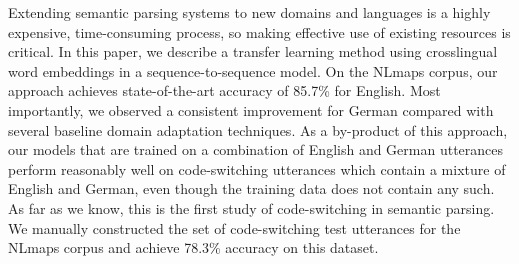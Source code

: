 Extending semantic parsing systems to new domains and languages is a highly expensive, time-consuming process, so making effective use of existing resources is critical. In this paper, we describe a transfer learning method using crosslingual word embeddings in a sequence-to-sequence model.  On the NLmaps corpus, our approach achieves state-of-the-art accuracy of 85.7\% for English.  Most importantly, we observed a consistent improvement for German compared with several baseline domain adaptation techniques.  As a by-product of this approach, our models that are trained on a combination of English and German utterances perform reasonably well on code-switching utterances which contain a mixture of English and German, even though the training data does not contain any such. As far as we know, this is the first study of code-switching in semantic parsing. We manually constructed the set of code-switching test utterances for the NLmaps corpus and achieve 78.3\% accuracy on this dataset.
